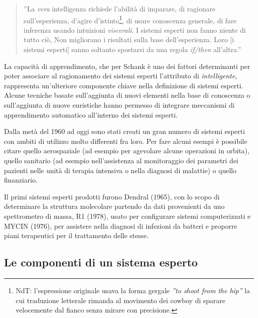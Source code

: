 \begin{quotation}
''La \emph{vera} intelligenza richiede l'abilità di imparare, di ragionare sull'esperienza, d'agire d'istinto\footnote{NdT: l'espressione originale usava la forma gergale \emph{''to shoot from the hip''} la cui traduzione letterale rimanda al movimento dei cowboy di sparare velocemente dal fianco senza mirare con precisione.}, di usare conoscenza generale, di fare inferenza usando intuizioni \emph{viscerali}. I sistemi esperti non fanno niente di tutto ciò, Non migliorano i risultati sulla base dell'esperienza. Loro [i sistemi esperti] sanno soltanto spostarsi da una regola \emph{if/then} all'altra.'' \cite{schank1984ia} 
\end{quotation}

La capacità di apprendimento, che per Schank \cite{schank1984ia} è uno dei fattori determinanti per poter associare al ragionamento dei sistemi esperti l'attributo di \emph{intelligente}, rappresenta un'ulteriore componente chiave nella definizione di sistemi esperti. Alcune tecniche basate sull'aggiunta di nuovi elementi nella base di conoscenza o sull'aggiunta di nuove euristiche hanno permesso di integrare meccanismi di apprendimento automatico all'interno dei sistemi esperti. \cite{nasa1988flops}

Dalla metà del 1960 ad oggi  sono stati creati un gran numero di sistemi esperti con ambiti di utilizzo molto differenti fra loro. Per fare alcuni esempi è possibile citare quello aerospaziale (ad esempio per agevolare alcune operazioni in orbita), quello sanitario (ad esempio nell'assistenza al monitoraggio dei parametri dei pazienti nelle unità di terapia intensiva o nella diagnosi di malattie) o quello finanziario.~\cite{jackson1999}

Il primi sistemi esperti prodotti furono Dendral (1965), con lo scopo di determinare la struttura molecolare partendo da dati provenienti da uno spettrometro di massa, R1 (1978), usato per configurare sistemi computerizzati e MYCIN (1976), per assistere nella diagnosi di infezioni da batteri e proporre piani terapeutici per il trattamento delle stesse.

\subsection{Le componenti di un sistema esperto} 

